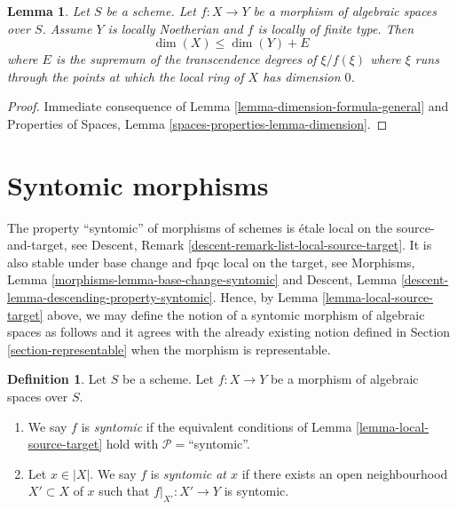 \documentclass{stacks-project}
\theoremstyle{plain}
\newtheorem{lemma}[subsection]{Lemma}
\theoremstyle{definition}
\newtheorem{definition}[subsection]{Definition}
\theoremstyle{remark}
\numberwithin{equation}{subsection}
\begin{document}
\begin{lemma}
\label{lemma-alteration-dimension-general}
Let $S$ be a scheme.
Let $f : X \to Y$ be a morphism of algebraic spaces over $S$. Assume
$Y$ is locally Noetherian and $f$ is locally of finite type.
Then
$$
\dim(X) \leq \dim(Y) + E
$$
where $E$ is the supremum of the transcendence degrees of
$\xi/f(\xi)$ where $\xi$ runs through the points at
which the local ring of $X$ has dimension $0$.
\end{lemma}

\begin{proof}
Immediate consequence of Lemma \ref{lemma-dimension-formula-general}
and Properties of Spaces, Lemma \ref{spaces-properties-lemma-dimension}.
\end{proof}







\section{Syntomic morphisms}
\label{section-syntomic}

\noindent
The property ``syntomic'' of morphisms of schemes is
\'etale local on the source-and-target, see
Descent, Remark \ref{descent-remark-list-local-source-target}.
It is also stable under base change and fpqc local on the target, see
Morphisms, Lemma \ref{morphisms-lemma-base-change-syntomic} and
Descent, Lemma \ref{descent-lemma-descending-property-syntomic}.
Hence, by
Lemma \ref{lemma-local-source-target}
above, we may define the notion of a syntomic morphism of algebraic spaces as
follows and it agrees with the already existing notion defined in
Section \ref{section-representable}
when the morphism is representable.

\begin{definition}
\label{definition-syntomic}
Let $S$ be a scheme.
Let $f : X \to Y$ be a morphism of algebraic spaces over $S$.
\begin{enumerate}
\item We say $f$ is {\it syntomic} if the equivalent conditions of
Lemma \ref{lemma-local-source-target}
hold with $\mathcal{P} =$``syntomic''.
\item Let $x \in |X|$. We say $f$ is {\it syntomic at $x$} if
there exists an open neighbourhood $X' \subset X$ of $x$ such
that $f|_{X'} : X' \to Y$ is syntomic.
\end{enumerate}
\end{definition}
\end{document}
